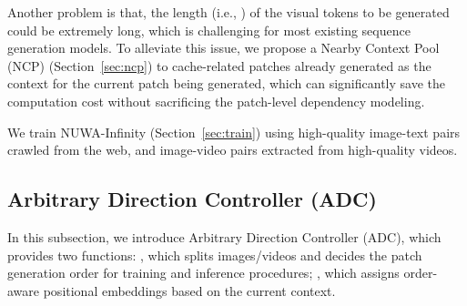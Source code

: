 \documentclass{article}
\begin{document}
Another problem is that, the length (i.e., ) of the visual tokens to be generated could be extremely long, which is challenging for most existing sequence generation models. To alleviate this issue, we propose a Nearby Context Pool (NCP) (Section~\ref{sec:ncp}) to cache-related patches already generated as the context for the current patch being generated, which can significantly save the computation cost without sacrificing the patch-level dependency modeling.

We train NUWA-Infinity (Section~\ref{sec:train}) using high-quality image-text pairs crawled from the web, and image-video pairs extracted from high-quality videos.














































 














\subsection{Arbitrary Direction Controller (ADC)}\label{sec:adc}


In this subsection, we introduce Arbitrary Direction Controller (ADC), which provides two functions: , which splits images/videos and decides the patch generation order for training and inference procedures; , which assigns order-aware positional embeddings based on the current context.
\end{document}
